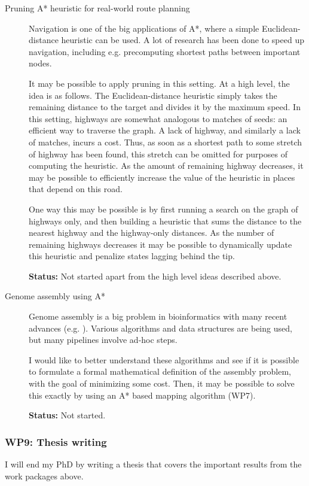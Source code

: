\documentclass[11pt,english,a4paper]{article}
\begin{document}
\begin{description}
\item[{Pruning A* heuristic for real-world route planning}] Navigation is one of the big applications of A*, where a simple
Euclidean-distance heuristic can be used.
A lot of research has been done to speed up navigation, including
e.g. precomputing shortest paths between important nodes.

It may be possible to apply pruning in this setting. At a high level, the
idea is as follows. The Euclidean-distance heuristic simply takes the
remaining distance to the target and divides it by the maximum speed. In this
setting, highways are somewhat analogous to matches of seeds: an efficient
way to traverse the graph. A lack of highway, and similarly a lack of
matches, incurs a cost. Thus, as soon as a shortest path to some stretch of
highway has been found, this stretch can be omitted for purposes of computing the
heuristic. As the amount of remaining highway decreases, it may be possible
to efficiently increase the value of the heuristic in places that depend on
this road.

One way this may be possible is by first running a search on the graph of
highways only, and then building a heuristic that sums the distance to the
nearest highway and the highway-only distances. As the number of remaining
highways decreases it may be possible to dynamically update this heuristic
and penalize states lagging behind the tip.

\textbf{Status:} Not started apart from the high level ideas described above.

\item[{Genome assembly using A*}] Genome assembly is a big problem in bioinformatics with many recent advances
(e.g. \textcite{verkko}).
Various algorithms and data structures are being used, but many pipelines
involve ad-hoc steps.

I would like to better understand these algorithms and see if it is possible
to formulate a formal mathematical definition of the assembly problem, with
the goal of minimizing some cost. Then, it may be possible to solve this
exactly by using an A* based mapping algorithm (WP7).

\textbf{Status:} Not started.
\end{description}

\subsubsection{WP9: Thesis writing}
\label{sec:orge3a013a}
I will end my PhD by writing a thesis that covers the important results from the work
packages above.
\end{document}
